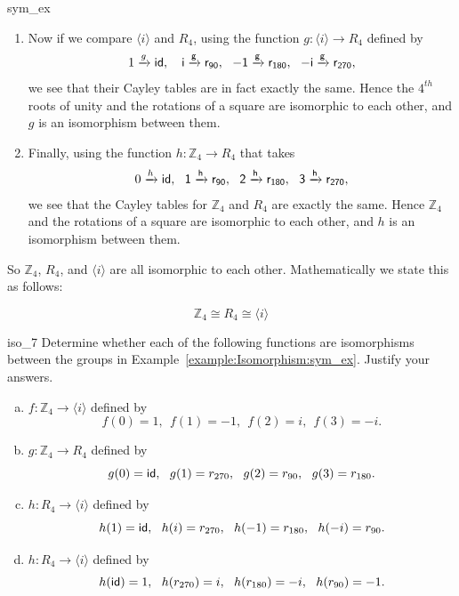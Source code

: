 \begin{example}{sym_ex}
\begin{enumerate}[(1)]
\item
Now if we compare $\langle i \rangle$ and $R_4$, using the function  $g: \langle i \rangle \longrightarrow R_4$  defined by
\begin{align*}
1 \xrightarrow{g} \sf{id}, ~~\
i \xrightarrow{g}  r_{90},~~
-1 \xrightarrow{g} r_{180},~~
 -i \xrightarrow{g} r_{270}, 
\end{align*}
we see that their Cayley tables are in fact exactly the same.  Hence the $4^{th}$ roots of unity and the rotations of a square are isomorphic to each other, and $g$ is an isomorphism between them.  

\item
Finally, using the  function
$h: {\mathbb Z_4} \longrightarrow R_4$  that takes
\begin{align*}
 0\xrightarrow{h} \sf{id},~~
    1 \xrightarrow{h} r_{90},~~
    2 \xrightarrow{h} r_{180},~~
    3 \xrightarrow{h} r_{270}, 
\end{align*}
we see that the Cayley tables for ${\mathbb Z_4}$ and $R_4$ are exactly the same.  Hence ${\mathbb Z_4}$ and the rotations of a square are isomorphic to each other, and $h$ is an isomorphism between them.
\end{enumerate}

\noindent
So ${\mathbb Z_4}$, $R_4$, and $\langle i \rangle$ are all isomorphic to each other. Mathematically we state this as follows:

\[ {\mathbb Z_4} \cong  R_4 \cong \langle i \rangle \]
 
 \end{example}
 
 

 \begin{exercise}{iso_7}
 Determine whether each of the following functions are isomorphisms between the groups in Example~\ref{example:Isomorphism:sym_ex}. Justify your answers. 
 \begin{enumerate}[(a)]
 \item
 $ f: {\mathbb Z_4}  \longrightarrow \langle i \rangle$ defined by 
\[  
f(0) = 1,~~
 f(1) = -1,~~
 f(2) = i,~~
 f(3) = -i.
\]
 
 \item
$ g: {\mathbb Z_4}  \longrightarrow R_4$ defined by 
\[ 
g(0) = {\sf{i}d},~~
 g(1) = r_{270},~~
 g(2) = r_{90} ,~~
 g(3) = r_{180}. 
 \]
 
 \item
 $ h: R_4 \longrightarrow \langle i \rangle$ defined by 
\[ 
 h(1) = {\sf{i}d},~~ 
h(i) = r_{270},~~
h(-1) = r_{180},~~
 h(-i) = r_{90}.
\]


 \item
 $ h: R_4 \longrightarrow \langle i \rangle$ defined by 
\[ 
 h({\sf{i}d}) = 1,~~ 
h(r_{270}) = i,~~
h(r_{180}) = -i,~~
 h(r_{90}) =-1.
\]

\end{enumerate}
 \end{exercise}

